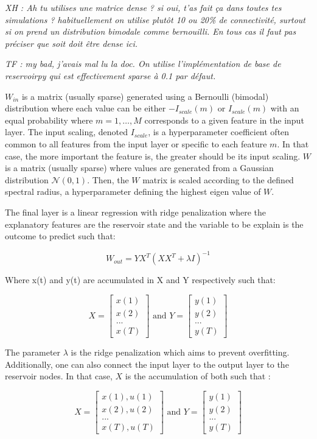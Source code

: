 \documentclass[
  11pt,
  a4paper,
]{article}
\theoremstyle{plain}
\theoremstyle{remark}
\begin{document}
\emph{XH : Ah tu utilises une matrice dense ? si oui, t'as fait ça dans
toutes tes simulations ? habituellement on utilise plutôt 10 ou 20\% de
connectivité, surtout si on prend un distribution bimodale comme
bernouilli. En tous cas il faut pas préciser que soit doit être dense
ici.}

\emph{TF : my bad, j'avais mal lu la doc. On utilise l'implémentation de
base de reservoirpy qui est effectivement sparse à 0.1 par défaut.}

\(W_{in}\) is a matrix (usually sparse) generated using a Bernoulli
(bimodal) distribution where each value can be either \(-I_{scale}(m)\)
or \(I_{scale}(m)\) with an equal probability where \(m = 1, …, M\)
corresponds to a given feature in the input layer. The input scaling,
denoted \(I_{scale}\), is a hyperparameter coefficient often common to
all features from the input layer or specific to each feature \(m\). In
that case, the more important the feature is, the greater should be its
input scaling. \(W\) is a matrix (usually sparse) where values are
generated from a Gaussian distribution \(\mathcal{N}(0,1)\). Then, the
\(W\) matrix is scaled according to the defined spectral radius, a
hyperparameter defining the highest eigen value of \(W\).

The final layer is a linear regression with ridge penalization where the
explanatory features are the reservoir state and the variable to be
explain is the outcome to predict such that:

\[W_{out} = YX^T ( XX^T + \lambda  I)^{ -1 }\]

Where x(t) and y(t) are accumulated in X and Y respectively such that:

\[X = \begin{bmatrix} x(1) \\ x(2) \\ ... \\ x(T) \end{bmatrix}
\text{ and } Y = \begin{bmatrix} y(1) \\ y(2) \\ ... \\ y(T) \end{bmatrix}\]

The parameter \(\lambda\) is the ridge penalization which aims to
prevent overfitting. Additionally, one can also connect the input layer
to the output layer to the reservoir nodes. In that case, \(X\) is the
accumulation of both such that :

\[X = \begin{bmatrix} x(1), u(1) \\ x(2), u(2) \\ ... \\ x(T), u(T) \end{bmatrix}
\text{ and } Y = \begin{bmatrix} y(1) \\ y(2) \\ ... \\ y(T) \end{bmatrix}\]
\end{document}
